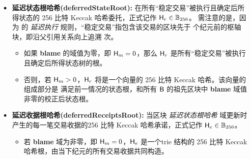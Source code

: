\begin{itemize}[nosep]
	\item {\bf 延迟状态根哈希(deferredStateRoot):} 在所有“稳定交易”被执行且确定后所得状态的 256 比特 Keccak 哈希委托，正式记作 $\textsf{H}_r\in\mathbb{B}_{256}$。
	需注意的是，因为 {\name} 的 \emph{延迟执行} 规则，“稳定交易”指包含该交易的区块先于  个纪元前的枢轴块，即沿父引用关系向上追溯  次。
	\begin{itemize}
		\item 如果 {\bf blame} 的域值为零，即 $\textsf{H}_m=0$，那么 $\textsf{H}_r$ 是所有“稳定交易”被执行且确定后所得状态树的根。
	
		\item 否则，若 $\textsf{H}_m>0$，$\textsf{H}_r$ 将是一个向量的 256 比特 Keccak 哈希。该向量的组成部分是 满足前一情况的状态根，和所有 $\textsf{B}$ 的祖先区块中 {\bf blame} 域值非零的校正后状态根。
	\end{itemize}
	
	
	\item {\bf 延迟收据根哈希(deferredReceiptsRoot):} 当区块 \emph{延迟状态根哈希} 域更新时产生的每一笔交易收据的256 比特 Keccak 哈希承诺，正式记作 $\textsf{H}_e\in\mathbb{B}_{256}$。
	\begin{itemize}
		\item 若 {\bf blame} 域为非零，即 $\textsf{H}_m=0$，$\textsf{H}_e$ 是一个trie 结构的 256 比特 Keccak 哈希根，由当下纪元的所有交易收据共同构造。
		

\end{itemize}
\end{itemize}
